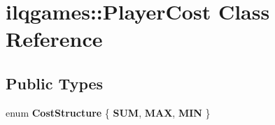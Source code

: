 \hypertarget{classilqgames_1_1_player_cost}{}\section{ilqgames\+:\+:Player\+Cost Class Reference}
\label{classilqgames_1_1_player_cost}
\subsection*{Public Types}
\begin{DoxyCompactItemize}
\item 
enum {\bfseries Cost\+Structure} \{ {\bfseries S\+UM}, 
{\bfseries M\+AX}, 
{\bfseries M\+IN}
 \}\hypertarget{classilqgames_1_1_player_cost_ace95c2515185110fe4db8f1274ef66f9}{}\label{classilqgames_1_1_player_cost_ace95c2515185110fe4db8f1274ef66f9}

\end{DoxyCompactItemize}
